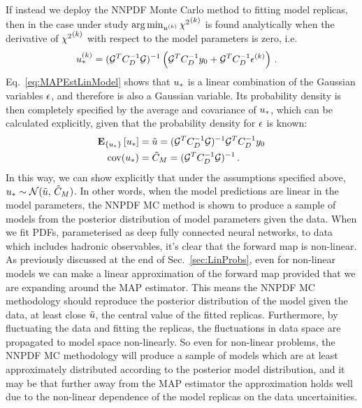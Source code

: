 If instead we deploy the NNPDF Monte Carlo method to fitting model replicas,
then in the case under study $\arg\min_{u^{(k)}} {\chi^2}^{(k)}$ is found
analytically when the derivative of ${\chi^2}^{(k)}$ with respect to the model
parameters is zero, i.e.
\begin{equation}
    \begin{split}
        \label{eq:MAPEstLinModel}
        u_*^{(k)} &= (\mathcal{G}^T C_{D}^{-1} \mathcal{G})^{-1}
        \left(
            \mathcal{G}^T C_{D}^{-1} y_0 +
            \mathcal{G}^T C_{D}^{-1} \epsilon^{(k)}
        \right) \, .
    \end{split}
\end{equation}
Eq.~\ref{eq:MAPEstLinModel} shows that $u_*$ is a linear
combination of the Gaussian variables $\epsilon$, and therefore is
also a Gaussian variable. Its
probability density is then completely specified by the average and
covariance of $u_*$, which can be calculated explicitly, given that the
probability density for $\epsilon$ is known:
\begin{align}
    \mathbf{E}_{\{ u_* \}} \left[ u_* \right] &=
    \tilde{u} = (\mathcal{G}^T C_{D}^{-1} \mathcal{G})^{-1} \mathcal{G}^T
    C_{D}^{-1} y_0 \\
    {\rm cov}(u_*) &= \tilde{C}_M = (\mathcal{G}^T C_{D}^{-1} \mathcal{G})^{-1} \, .
\end{align}
In this way, we can show explicitly that under the assumptions specified above,
$u_* \sim \mathcal{N}(\tilde{u}, \, \tilde{C}_M)$.
In other words, when the model predictions are linear in the model parameters,
the NNPDF MC method is shown to produce a sample of models from the posterior
distribution of model parameters given the data. When we fit PDFs, parameterised
as deep fully connected neural networks, to data which
includes hadronic observables, it's clear that the forward map is non-linear.
As previously discussed at the end of Sec.~\ref{sec:LinProbs}, even for non-linear
models we can make a linear approximation of the forward map provided that we are
expanding around the MAP estimator. This means the NNPDF MC methodology
should reproduce the posterior distribution of the model given the data, at least
close $\tilde{u}$, the central value of the fitted replicas. Furthermore,
by fluctuating the data and fitting the replicas, the fluctuations in data space
are propagated to model space non-linearly. So even for non-linear problems, the
NNPDF MC methodology will produce a sample of models which are at least approximately
distributed according to the posterior model distribution, and it may be that
further away from the MAP estimator the approximation holds well due to the
non-linear dependence of the model replicas on the data uncertainities.

